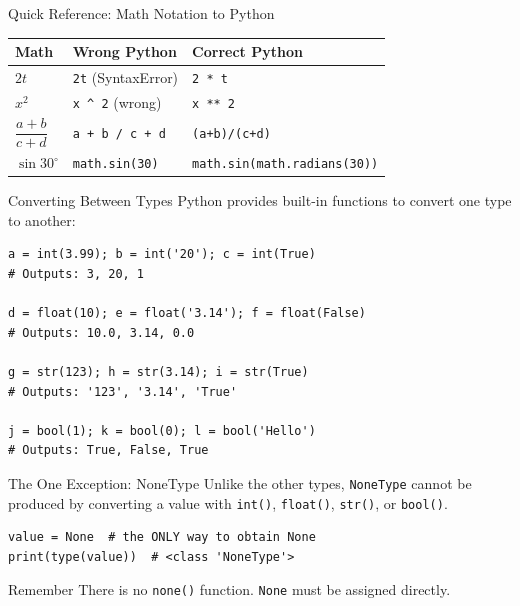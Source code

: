\documentclass[9pt,aspectratio=169,xcolor=table]{beamer}
\newcommand{\striped}{\rowcolors{1}{white}{stripe}}
\begin{document}
\begin{frame}{Quick Reference: Math Notation to Python}
    \leavevmode
    \small
    \striped
    \begin{center}
    \begin{tabular}{p{3.0cm}p{3.6cm}p{3.6cm}}
        \toprule
        \textbf{Math} & \textbf{Wrong Python} & \textbf{Correct Python} \\
        \midrule
        $2t$ & \texttt{2t} (SyntaxError) & \texttt{2 * t} \\
        $x^2$ & \texttt{x \^{} 2} (wrong) & \texttt{x ** 2} \\
        $\dfrac{a+b}{c+d}$ & \texttt{a + b / c + d} & \texttt{(a+b)/(c+d)} \\
        $\sin 30^\circ$ & \texttt{math.sin(30)} & \texttt{math.sin(}\newline\texttt{math.radians(30))} \\
        \bottomrule
    \end{tabular}
    \end{center}
\end{frame}

\begin{frame}[fragile]{Converting Between Types}
    \leavevmode
    Python provides built-in functions to convert one type to another:

\begin{lstlisting}
a = int(3.99); b = int('20'); c = int(True)
# Outputs: 3, 20, 1

d = float(10); e = float('3.14'); f = float(False)
# Outputs: 10.0, 3.14, 0.0

g = str(123); h = str(3.14); i = str(True)
# Outputs: '123', '3.14', 'True'

j = bool(1); k = bool(0); l = bool('Hello')
# Outputs: True, False, True
\end{lstlisting}
\end{frame}

\begin{frame}[fragile]{The One Exception: NoneType}
    \leavevmode
    Unlike the other types, \texttt{NoneType} \alert{cannot} be produced
    by converting a value with \texttt{int()}, \texttt{float()},
    \texttt{str()}, or \texttt{bool()}.

\begin{lstlisting}
value = None  # the ONLY way to obtain None
print(type(value))  # <class 'NoneType'>
\end{lstlisting}

    \vspace{3mm}
    \begin{block}{Remember}
        There is no \texttt{none()} function. \texttt{None} must be
        assigned directly.
    \end{block}
\end{frame}
\end{document}
